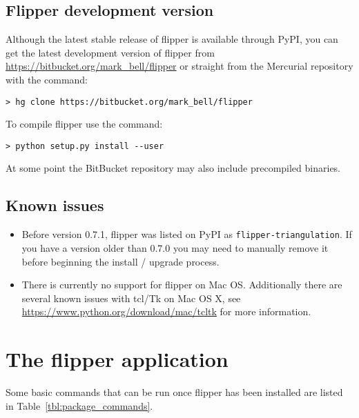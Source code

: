 \documentclass[a4paper]{article}
\begin{document}
\subsection{Flipper development version}
Although the latest stable release of flipper is available through PyPI, you can get the latest development version of flipper from \url{https://bitbucket.org/mark_bell/flipper} or straight from the Mercurial \cite{mercurial} repository with the command:
\begin{lstlisting}
> hg clone https://bitbucket.org/mark_bell/flipper
\end{lstlisting}
To compile flipper use the command:
\begin{lstlisting}
> python setup.py install --user
\end{lstlisting}

At some point the BitBucket repository may also include precompiled binaries.

\subsection{Known issues}

\begin{itemize}
\item Before version 0.7.1, flipper was listed on PyPI as \texttt{flipper-triangulation}. If you have a version older than 0.7.0 you may need to manually remove it before beginning the install / upgrade process.
\item There is currently no support for flipper on Mac OS. Additionally there are several known issues with tcl/Tk on Mac OS X, see \url{https://www.python.org/download/mac/tcltk} for more information.
\end{itemize}

\section{The flipper application}

Some basic commands that can be run once flipper has been installed are listed in Table~\ref{tbl:package_commands}.
\end{document}
